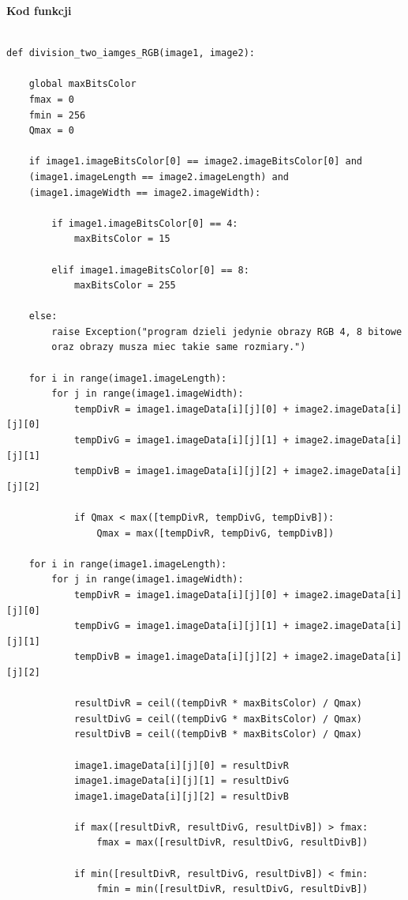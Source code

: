 \documentclass[magisterska,openany]{pracadypl}
\begin{document}
\newpage
\textbf{\Large Kod funkcji}
   
\lstset{language=Python}
\vspace{0.25cm}
\begin{lstlisting}[caption={Dzielenie dwóch obrazów}]

def division_two_iamges_RGB(image1, image2):

    global maxBitsColor
    fmax = 0
    fmin = 256
    Qmax = 0

    if image1.imageBitsColor[0] == image2.imageBitsColor[0] and 
    (image1.imageLength == image2.imageLength) and 
    (image1.imageWidth == image2.imageWidth):

        if image1.imageBitsColor[0] == 4:
            maxBitsColor = 15

        elif image1.imageBitsColor[0] == 8:
            maxBitsColor = 255

    else:
        raise Exception("program dzieli jedynie obrazy RGB 4, 8 bitowe 
        oraz obrazy musza miec takie same rozmiary.")

    for i in range(image1.imageLength):
        for j in range(image1.imageWidth):
            tempDivR = image1.imageData[i][j][0] + image2.imageData[i][j][0]
            tempDivG = image1.imageData[i][j][1] + image2.imageData[i][j][1]
            tempDivB = image1.imageData[i][j][2] + image2.imageData[i][j][2]

            if Qmax < max([tempDivR, tempDivG, tempDivB]):
                Qmax = max([tempDivR, tempDivG, tempDivB])

    for i in range(image1.imageLength):
        for j in range(image1.imageWidth):
            tempDivR = image1.imageData[i][j][0] + image2.imageData[i][j][0]
            tempDivG = image1.imageData[i][j][1] + image2.imageData[i][j][1]
            tempDivB = image1.imageData[i][j][2] + image2.imageData[i][j][2]

            resultDivR = ceil((tempDivR * maxBitsColor) / Qmax)
            resultDivG = ceil((tempDivG * maxBitsColor) / Qmax)
            resultDivB = ceil((tempDivB * maxBitsColor) / Qmax)

            image1.imageData[i][j][0] = resultDivR
            image1.imageData[i][j][1] = resultDivG
            image1.imageData[i][j][2] = resultDivB

            if max([resultDivR, resultDivG, resultDivB]) > fmax:
                fmax = max([resultDivR, resultDivG, resultDivB])

            if min([resultDivR, resultDivG, resultDivB]) < fmin:
                fmin = min([resultDivR, resultDivG, resultDivB])


\end{lstlisting}
\end{document}

